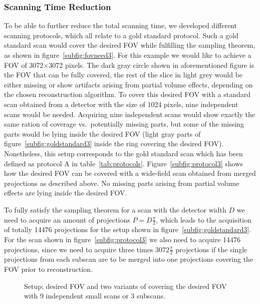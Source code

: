 \cbstart
\subsubsection{Scanning Time Reduction}

To be able to further reduce the total scanning time, we developed different scanning protocols, which all relate to a gold standard protocol. Such a gold standard scan would cover the desired FOV while fulfilling the sampling theorem, as shown in figure~\ref{subfig:fovneed3}. For this example we would like to achieve a FOV of 3072$\times$3072 pixels. The dark gray circle shown in aforementioned figure is the FOV that can be fully covered, the rest of the slice in light grey would be either missing or show artifacts arising from partial volume effects, depending on the chosen reconstruction algorithm. To cover this desired FOV with a standard scan obtained from a detector with the size of 1024 pixels, nine independent scans would be needed. Acquiring nine independent scans would show exactly the same ration of coverage vs.\ potentially missing parts, but some of the missing parts would be lying inside the desired FOV (light gray parts of figure~\ref{subfig:goldstandard3} inside the ring covering the desired FOV). Nonetheless, this setup corresponds to the gold standard scan which has been defined as protocol A in table~\ref{tab:protocols}. Figure~\ref{subfig:protocol3} shows how the desired FOV can be covered with a wide-field scan obtained from merged projections as described above. No missing parts arising from partial volume effects are lying inside the desired FOV.

To fully satisfy the sampling theorem for a scan with the detector width $D$ we need to acquire an amount of projections $P=D\frac{\pi}{2}$, which leads to the acquisition of totally 14476 projections for the setup shown in figure~\ref{subfig:goldstandard3}. For the scan shown in figure~\ref{subfig:protocol3} we also need to acquire 14476 projections, since we need to acquire three times $3072\frac{\pi}{2}$ projections if the single projections from each subscan are to be merged into one projections covering the FOV prior to reconstruction.
\cbend

\cbstart
\begin{figure*}[htp]
	\centering%
	\caption{Setup; desired FOV and two variants of covering the desired FOV with 9 independent small scans or 3 subscans.}%
	\label{fig:Setup3SubScans}%
\end{figure*}

